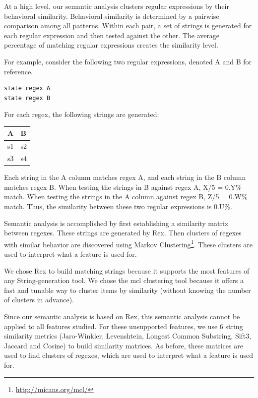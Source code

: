 At a high level, our semantic analysis clusters regular expressions by their behavioral similarity. Behavioral similarity is determined by a pairwise comparison among all patterns. Within each pair, a set of strings is generated for each regular expression and then tested against the other. The average percentage of matching regular expressions creates the similarity level. 

For example, consider the following two regular expressions, denoted A and B for reference. 

\begin{verbatim}
state regex A
state regex B
\end{verbatim}

For each regex, the following strings are generated:

\begin{tabular}{l | l} 
A & B \\ \hline
s1 & s2 \\
s3 & s4 \\ 
\end{tabular}

Each string in the A column matches regex A, and each string in the B column matches regex B. When testing the strings in B against regex A, X/5 = 0.Y\% match. When testing the strings in the A column against regex B, Z/5 = 0.W\% match. Thus, the similarity between these two regular expressions is 0.U\%. 

Semantic analysis is accomplished by first establishing a similarity matrix between regexes. These strings are generated by Rex.  Then clusters of regexes with similar behavior are discovered using Markov Clustering\footnote{\url{http://micans.org/mcl/}}.  These clusters are used to interpret what a feature is used for.

We chose Rex to build matching strings because it supports the most features of any String-generation tool.  We chose the mcl clustering tool because it offers a fast and tunable way to cluster items by similarity (without knowing the number of clusters in advance).

Since our semantic analysis is based on Rex, this semantic analysis cannot be applied to all features studied.  For these unsupported features, we use 6 string similarity metrics (Jaro-Winkler, Levenshtein, Longest Common Substring, Sift3, Jaccard and Cosine) to build similarity matrices.  As before, these matrices are used to find clusters of regexes, which are used to interpret what a feature is used for.





